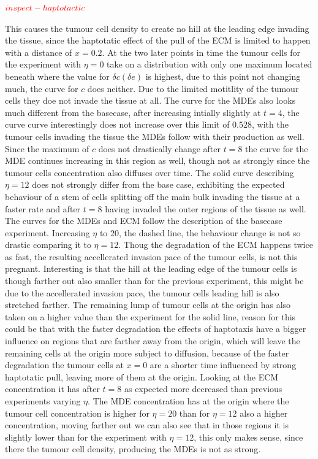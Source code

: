 $\textcolor{red}{inspect-haptotactic}$

This causes the tumour cell density to create no hill at the leading edge invading the tissue, since the haptotatic effect of the pull of the ECM is limited to happen with a distance of $x=0.2$. At the two later points in time the tumour cells for the experiment with $\eta=0$ take on a distribution with only one maximum located beneath where the value for $\delta c (\delta e)$ is highest, due to this point not changing much, the curve for $c$ does neither. Due to the limited motitlity of the tumour cells they doe not invade the tissue at all. The curve for the MDEs also looks much different from the basecase, after increasing intially slightly at $t=4$, the curve curve interestingly does not increase over this limit of $0.528$, with the tumour cells invading the tissue the MDEs follow with their production as well. Since the maximum of $c$ does not drastically change after $t=8$ the curve for the MDE continues increasing in this region as well, though not as strongly since the tumour cells concentration also diffuses over time. 
The solid curve describing $\eta=12$ does not strongly differ from the base case, exhibiting the expected behaviour of a stem of cells splitting off the main bulk invading the tissue at a faster rate and after $t=8$ having invaded the outer regions of the tissue as well. The curves for the MDEs and ECM follow the description of the basecase experiment. 
Increasing $\eta$ to $20$, the dashed line, the behaviour change is not so drastic comparing it to $\eta=12$. Thoug the degradation of the ECM happens twice as fast, the resulting accellerated invasion pace of the tumour cells, is not this pregnant. Interesting is that the hill at the leading edge of the tumour cells is though farther out also smaller than for the previous experiment, this might be due to the accellerated invasion pace, the tumour cells leading hill is also stretched farther. The remaining lump of tumour cells at the origin has also taken on a higher value than the experiment for the solid line, reason for this could be that with the faster degradation the effects of haptotaxis have a bigger influence on regions that are farther away from the origin, which will leave the remaining cells at the origin more subject to diffusion, because of the faster degradation the tumour cells at $x=0$ are a shorter time influenced by strong haptotatic pull, leaving more of them at the origin. Looking at the ECM concentration it has after $t=8$ as expected more decreased than previous experiments varying $\eta$. The MDE concentration has at the origin where the tumour cell concentration is higher for $\eta=20$ than for $\eta=12$ also a higher concentration, moving farther out we can also see that in those regions it is slightly lower than for the experiment with $\eta=12$, this only makes sense, since there the tumour cell density, producing the MDEs is not as strong. 
